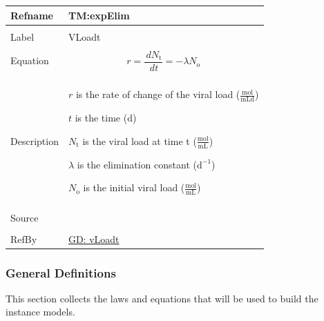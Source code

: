\documentclass[12pt]{article}
\begin{document}
\vspace{\baselineskip}
\noindent
\begin{minipage}{\textwidth}
\begin{tabular}{>{\raggedright}p{}>{\raggedright\arraybackslash}p{}}
\toprule \textbf{Refname} & \textbf{TM:expElim}
\label{TM:expElim}
\\ \midrule \\
Label & VLoadt
        
\\ \midrule \\
Equation & \begin{displaymath}
           r=\frac{\,d{N_{\text{t}}}}{\,dt}=-λ {N_{\text{o}}}
           \end{displaymath}
\\ \midrule \\
Description & \begin{symbDescription}
              \item{$r$ is the rate of change of the viral load ($\frac{\text{mol}}{\text{mL}\text{d}}$)}
              \item{$t$ is the time (${\text{d}}$)}
              \item{${N_{\text{t}}}$ is the viral load at time t ($\frac{\text{mol}}{\text{mL}}$)}
              \item{$λ$ is the elimination constant ($\text{d}^{-1}$)}
              \item{${N_{\text{o}}}$ is the initial viral load ($\frac{\text{mol}}{\text{mL}}$)}
              \end{symbDescription}
\\ \midrule \\
Source & \cite{libretexts2020}
         
\\ \midrule \\
RefBy & \hyperref[GD:vLoadt]{GD: vLoadt}
        
\\ \bottomrule
\end{tabular}
\end{minipage}
\subsubsection{General Definitions}
\label{Sec:GDs}
This section collects the laws and equations that will be used to build the instance models.
\end{document}
